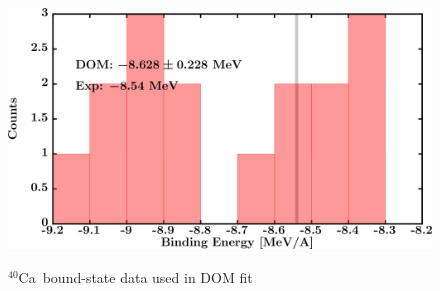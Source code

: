 \documentclass[twocolumn,secnumarabic,amssymb, nobibnotes, aps, prl,
superscriptaddress, nobalancelastpage]{revtex4}
\newcommand{\caForty}{\ensuremath{^{40}}C\lowercase{a}}
\begin{document}
\begin{figure}[!htb]
\begin{minipage}{0.4\linewidth}
        \label{DOM_ca40_RMSRadius}
    \end{minipage}
    \begin{minipage}{0.4\linewidth}
        \centering
        \includegraphics[width=\linewidth]{figures/ca40_BE.png}
        \label{DOM_ca40_BE}
    \end{minipage}
    \caption{\caForty\ bound-state data used in DOM fit}
    \label{DOM_ca40_structural}
\end{figure}
\end{document}
